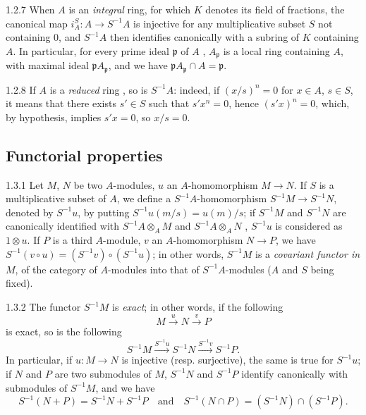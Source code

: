 \begin{env}{1.2.7}
\label{env-0.1.2.7}
When $A$ is an \emph{integral} ring, for which $K$ denotes its field of fractions, the
canonical map $i_A^S:A\to S^{-1}A$ is injective for any multiplicative subset $S$ not
containing $0$, and $S^{-1}A$ then identifies canonically with a subring of $K$ containing
$A$. In particular, for every prime ideal $\mathfrak{p}$ of $A$ , $A_\mathfrak{p}$ is a local
ring containing $A$, with maximal ideal $\mathfrak{p}A_\mathfrak{p}$, and we have
$\mathfrak{p}A_\mathfrak{p}\cap A=\mathfrak{p}$.
\end{env}

\begin{env}{1.2.8}
\label{env-0.1.2.8}
If $A$ is a \emph{reduced} ring , so is $S^{-1}A$: indeed, if $(x/s)^n=0$ for
$x\in A$, $s\in S$, it means that there exists $s'\in S$ such that $s'x^n=0$, hence
$(s'x)^n=0$, which, by hypothesis, implies $s'x=0$, so $x/s=0$.
\end{env}

\subsection{Functorial properties}
\label{0-prelim-1.3}

\begin{env}{1.3.1}
\label{env-0.1.3.1}
Let $M$, $N$ be two $A$-modules, $u$ an $A$-homomorphism $M\to N$. If $S$ is a multiplicative
subset of $A$, we define a $S^{-1}A$-homomorphism $S^{-1}M\to S^{-1}N$, denoted by $S^{-1}u$,
by putting $S^{-1}u(m/s)=u(m)/s$; if $S^{-1}M$ and $S^{-1}N$ are canonically identified with
$S^{-1}A\otimes_A M$ and $S^{-1}A\otimes_A N$ , $S^{-1}u$ is considered as
$1\otimes u$. If $P$ is a third $A$-module, $v$ an $A$-homomorphism $N\to P$, we have
$S^{-1}(v\circ u)=(S^{-1}v)\circ(S^{-1}u)$; in other words, $S^{-1}M$ is a \emph{covariant
functor in} $M$, of the category of $A$-modules into that of $S^{-1}A$-modules ($A$ and $S$
being fixed).
\end{env}

\begin{env}{1.3.2}
\label{env-0.1.3.2}
The functor $S^{-1}M$ is \emph{exact}; in other words, if the following
\[
  M\xrightarrow{u}N\xrightarrow{v}P
\]
is exact, so is the following
\[
  S^{-1}M\xrightarrow{S^{-1}u}S^{-1}N\xrightarrow{S^{-1}v}S^{-1}P.
\]
In particular, if $u:M\to N$ is injective (resp. surjective), the same is true for $S^{-1}u$;
if $N$ and $P$ are two submodules of $M$, $S^{-1}N$ and $S^{-1}P$ identify canonically with
submodules of $S^{-1}M$, and we have
\[
  S^{-1}(N+P)=S^{-1}N+S^{-1}P\quad\text{and}\quad S^{-1}(N\cap P)=(S^{-1}N)\cap(S^{-1}P).
\]
\end{env}

